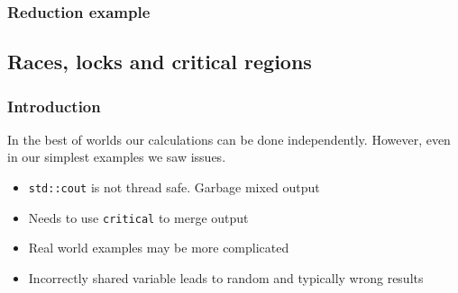 \subsubsection{Reduction example}\label{reduction-example}

\begin{Shaded}
\begin{Highlighting}[]

   
\NormalTok{\{}
     
      \NormalTok{;}
      

    \NormalTok{;}
    \NormalTok{;}

    \NormalTok{\{}
         \NormalTok{(} 
        \NormalTok{\{}
            \NormalTok{);}
            \NormalTok{/(} 
        \NormalTok{\}}
    \NormalTok{\}}
     
\NormalTok{\}}
\end{Highlighting}
\end{Shaded}

\subsection{Races, locks and critical
regions}\label{races-locks-and-critical-regions}

\subsubsection{Introduction}\label{introduction-3}

In the best of worlds our calculations can be done independently.
However, even in our simplest examples we saw issues.

\begin{itemize}
\itemsep1pt\parskip0pt
\item
  \texttt{std::cout} is not thread safe. Garbage mixed output
\item
  Needs to use \texttt{critical} to merge output
\item
  Real world examples may be more complicated
\item
  Incorrectly shared variable leads to random and typically wrong
  results
\end{itemize}

